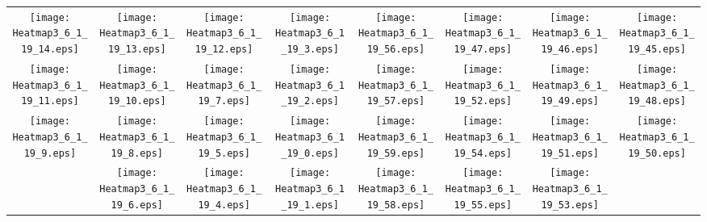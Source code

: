\documentclass{standalone}
\begin{document}
\begin{tabular}{ *8{c} }
\texttt{[image: Heatmap3\_6\_1\_19\_14.eps]} & \texttt{[image: Heatmap3\_6\_1\_19\_13.eps]} & \texttt{[image: Heatmap3\_6\_1\_19\_12.eps]} & \texttt{[image: Heatmap3\_6\_1\_19\_3.eps]} & \texttt{[image: Heatmap3\_6\_1\_19\_56.eps]} & \texttt{[image: Heatmap3\_6\_1\_19\_47.eps]} & \texttt{[image: Heatmap3\_6\_1\_19\_46.eps]} & \texttt{[image: Heatmap3\_6\_1\_19\_45.eps]} \\
\texttt{[image: Heatmap3\_6\_1\_19\_11.eps]} & \texttt{[image: Heatmap3\_6\_1\_19\_10.eps]} & \texttt{[image: Heatmap3\_6\_1\_19\_7.eps]} & \texttt{[image: Heatmap3\_6\_1\_19\_2.eps]} & \texttt{[image: Heatmap3\_6\_1\_19\_57.eps]} & \texttt{[image: Heatmap3\_6\_1\_19\_52.eps]} & \texttt{[image: Heatmap3\_6\_1\_19\_49.eps]} & \texttt{[image: Heatmap3\_6\_1\_19\_48.eps]} \\
\texttt{[image: Heatmap3\_6\_1\_19\_9.eps]} & \texttt{[image: Heatmap3\_6\_1\_19\_8.eps]} & \texttt{[image: Heatmap3\_6\_1\_19\_5.eps]} & \texttt{[image: Heatmap3\_6\_1\_19\_0.eps]} & \texttt{[image: Heatmap3\_6\_1\_19\_59.eps]} & \texttt{[image: Heatmap3\_6\_1\_19\_54.eps]} & \texttt{[image: Heatmap3\_6\_1\_19\_51.eps]} & \texttt{[image: Heatmap3\_6\_1\_19\_50.eps]} \\
 & \texttt{[image: Heatmap3\_6\_1\_19\_6.eps]} & \texttt{[image: Heatmap3\_6\_1\_19\_4.eps]} & \texttt{[image: Heatmap3\_6\_1\_19\_1.eps]} & \texttt{[image: Heatmap3\_6\_1\_19\_58.eps]} & \texttt{[image: Heatmap3\_6\_1\_19\_55.eps]} & \texttt{[image: Heatmap3\_6\_1\_19\_53.eps]} &  
\end{tabular}
\end{document}
